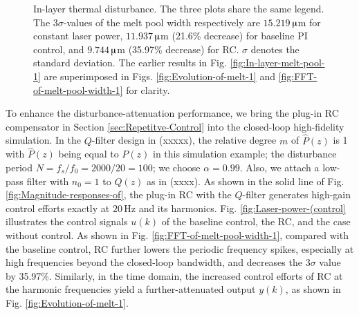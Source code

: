 \documentclass [11pt, proquest] {uwthesis}[2020/02/24]
\begin{document}
\begin{figure}[ht]
\begin{centering}
{\begin{centering}
\par\end{centering}
}
\par\end{centering}
\begin{centering}
\par\end{centering}
\centering{}\caption{\label{fig:In-layer-melt-pool}In-layer thermal disturbance. The three
plots share the same legend. The $3\sigma$-values of the melt pool
width respectively are $15.219\,$$\muup$m for constant laser power,
$11.937\,$$\muup$m (21.6\% decrease) for baseline PI control, and
$9.744\,$$\muup$m (35.97\% decrease) for RC. $\sigma$ denotes the
standard deviation. The earlier results in Fig. \ref{fig:In-layer-melt-pool-1}
are superimposed in Figs. \ref{fig:Evolution-of-melt-1} and \ref{fig:FFT-of-melt-pool-width-1}
for clarity.}
\end{figure}
To enhance the disturbance-attenuation performance, we bring the plug-in
RC compensator in Section \ref{sec:Repetitve-Control}
into the closed-loop high-fidelity simulation. In the $Q$-filter
design in (xxxxx), the relative degree $m$ of $\hat{P}(z)$
is 1 with $\hat{P}(z)$ being equal to $P(z)$ in this simulation
example; the disturbance period $N=f_{s}/f_{0}=2000/20=100$; we choose
$\alpha=0.99$. Also, we attach a low-pass filter with $n_{0}=1$
to $Q(z)$ as in (xxxx). As shown in the solid line of Fig.
\ref{fig:Magnitude-responses-of}, the plug-in RC with the $Q$-filter
generates high-gain control efforts exactly at $20\,\text{Hz}$ and
its harmonics. Fig. \ref{fig:Laser-power-(control} illustrates the
control signals $u(k)$ of the baseline control, the RC, and the case
without control. As shown in Fig. \ref{fig:FFT-of-melt-pool-width-1},
compared with the baseline control, RC further lowers the periodic
frequency spikes, especially at high frequencies beyond the closed-loop
bandwidth, and decreases the $3\sigma$ value by 35.97\%. Similarly,
in the time domain, the increased control efforts of RC at the harmonic
frequencies yield a further-attenuated output $y(k)$, as shown in
Fig. \ref{fig:Evolution-of-melt-1}.
\end{document}
